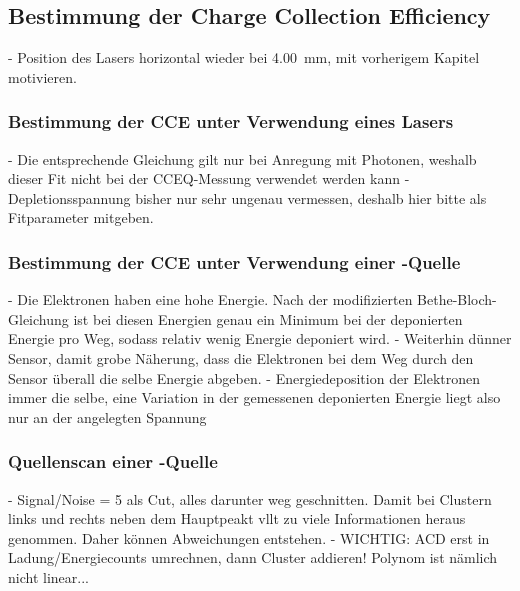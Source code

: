 \subsection{Bestimmung der Charge Collection Efficiency}
\label{sec:CCE-Auswertung}

- Position des Lasers horizontal wieder bei \SI{4.00}{\milli\meter}, mit vorherigem
Kapitel motivieren.

\subsubsection{Bestimmung der CCE unter Verwendung eines Lasers}
\label{sec:CCEL-Auswertung}

- Die entsprechende Gleichung gilt nur bei Anregung mit Photonen, weshalb dieser Fit
nicht bei der CCEQ-Messung verwendet werden kann
- Depletionsspannung bisher nur sehr ungenau vermessen, deshalb hier bitte als
Fitparameter mitgeben.

\subsubsection{Bestimmung der CCE unter Verwendung einer \texorpdfstring{}{Sr}-Quelle}
\label{sec:CCEQ-Auswertung}

- Die Elektronen haben eine hohe Energie. Nach der modifizierten Bethe-Bloch-Gleichung
ist bei diesen Energien genau ein Minimum bei der deponierten Energie pro Weg, sodass
relativ wenig Energie deponiert wird.
- Weiterhin dünner Sensor, damit grobe Näherung, dass die Elektronen bei dem Weg durch
den Sensor überall die selbe Energie abgeben.
- Energiedeposition der Elektronen immer die selbe, eine Variation in der gemessenen
deponierten Energie liegt also nur an der angelegten Spannung

\subsubsection{Quellenscan einer \texorpdfstring{}{Sr}-Quelle}
\label{sec:Quellenscan-Auswertung}

- Signal/Noise = 5 als Cut, alles darunter weg geschnitten. Damit bei Clustern
links und rechts neben dem Hauptpeakt vllt zu viele Informationen heraus genommen.
Daher können Abweichungen entstehen.
- WICHTIG: ACD erst in Ladung/Energiecounts umrechnen, dann Cluster addieren!
Polynom ist nämlich nicht linear...
